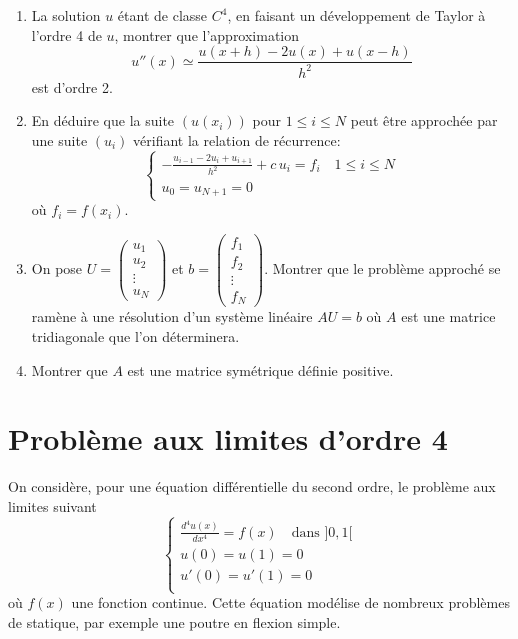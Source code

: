 \documentclass[a4paper]{article}
\begin{document}
\begin{enumerate}
\item La solution $u$ étant de classe $C^4$, en faisant un développement de Taylor à l'ordre 4 de $u$, montrer que l'approximation 
\[u''(x)\simeq \frac{u(x+h)-2u(x)+u(x-h)}{h^2}\] 
 est  d'ordre 2. 

\item En déduire que la suite $(u(x_i))$ pour $1\leq i\leq N$ peut être approchée par une suite $(u_i)$ vérifiant la relation de récurrence:
\[\left\{\begin{array}{l}
-\frac{u_{i-1}-2u_i+u_{i+1}}{h^2}+c\,u_i =f_i \quad1\leq i\leq N\\
u_0=u_{N+1}=0
\end{array}\right.
\]
où  $f_i=f(x_i)$.
\item On pose $U=\left(\begin{array}{c} u_1\\ u_2 \\ \vdots \\ u_N \end{array}\right)$ et $b=\left(\begin{array}{c} f_1\\ f_2 \\ \vdots \\ f_N \end{array}\right)$. Montrer que le problème approché se ramène à une résolution d'un système linéaire $A U = b$ où $A$ est une matrice tridiagonale que l'on déterminera.
\item Montrer que $A$ est une matrice symétrique définie positive.

\end{enumerate}

\section{Problème aux limites d'ordre 4}
 On considère, pour une équation différentielle du second ordre, le problème aux limites suivant
\[\left\{\begin{array}{l}
\frac{d^4u(x)}{dx^4}=f(x)\quad\mbox{dans }]0,1[\\
u(0)=u(1)=0\\
u'(0)=u'(1)=0\\
\end{array}\right.
\]
où $f(x)$ une fonction continue. Cette équation modélise de nombreux problèmes de statique, par exemple une poutre en flexion simple.
\end{document}
